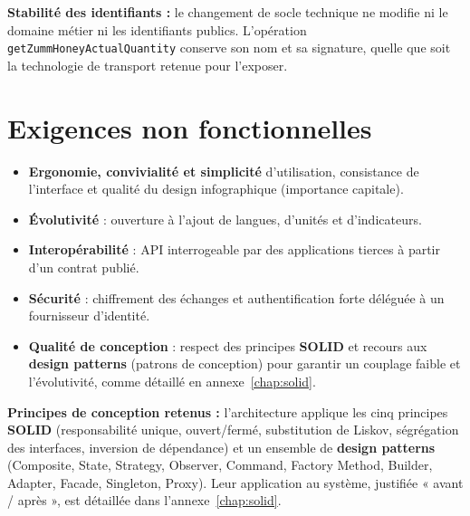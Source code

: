\begin{encadre}
\textbf{Stabilité des identifiants :} le changement de socle technique ne
modifie ni le domaine métier ni les identifiants publics. L'opération
\texttt{getZummHoneyActualQuantity} conserve son nom et sa signature, quelle que
soit la technologie de transport retenue pour l'exposer.
\end{encadre}

\section{Exigences non fonctionnelles}
\begin{itemize}
  \item \textbf{Ergonomie, convivialité et simplicité} d'utilisation, consistance de l'interface et qualité du design infographique (importance capitale).
  \item \textbf{Évolutivité} : ouverture à l'ajout de langues, d'unités et d'indicateurs.
  \item \textbf{Interopérabilité} : API interrogeable par des applications tierces à partir d'un contrat publié.
  \item \textbf{Sécurité} : chiffrement des échanges et authentification forte déléguée à un fournisseur d'identité.
  \item \textbf{Qualité de conception} : respect des principes \textbf{SOLID} et recours aux \textbf{design patterns} (patrons de conception) pour garantir un couplage faible et l'évolutivité, comme détaillé en annexe~\ref{chap:solid}.
\end{itemize}

\begin{encadre}
\textbf{Principes de conception retenus :} l'architecture applique les cinq
principes \textbf{SOLID} (responsabilité unique, ouvert/fermé, substitution de
Liskov, ségrégation des interfaces, inversion de dépendance) et un ensemble de
\textbf{design patterns} (Composite, State, Strategy, Observer, Command, Factory
Method, Builder, Adapter, Facade, Singleton, Proxy). Leur application au
système, justifiée « avant / après », est détaillée dans
l'annexe~\ref{chap:solid}.
\end{encadre}

